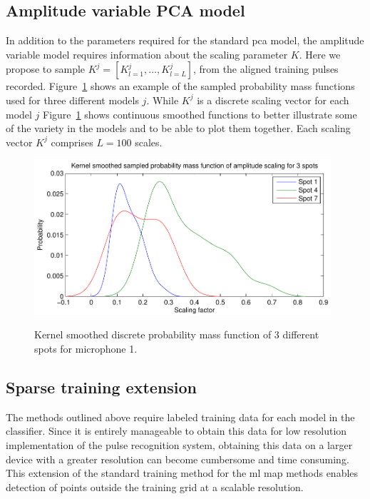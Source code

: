 \subsection{Amplitude variable PCA model}

In addition to the parameters required for the standard \DIFdelbegin {}\DIFdelend \DIFaddbegin \gls{pca} \DIFaddend model, the amplitude variable model requires information about the scaling parameter $K$. Here we propose to sample $K^j = [K^j_{l=1}, \ldots , K^j_{l=L}]$, from the aligned training pulses recorded. Figure~\ref{fig:amplitudeProbMass.pdf} shows an example of the sampled probability mass functions used for three different models $j$. \DIFaddbegin {}\DIFaddend While $K^j$ is a discrete scaling vector for each model $j$ Figure~\ref{fig:amplitudeProbMass.pdf} shows continuous smoothed functions to better illustrate some of the variety in the models and to be able to plot them together. Each scaling vector $K^j$ comprises $L=100$ scales.

\begin{figure}
\centering
  \includegraphics[width=110mm]{amplitudeProbMass.pdf}\\
  \caption{Kernel smoothed discrete probability mass function of 3 different spots for microphone 1.}\label{fig:amplitudeProbMass.pdf}
\end{figure}

\subsection{Sparse training extension}\label{sec:APRspareTraining}
The methods outlined above require labeled training data for each model in the classifier. Since it is entirely manageable to obtain this data for low resolution implementation of the pulse recognition system, obtaining this data on a larger device with a greater resolution can become cumbersome and time consuming. This extension of the standard training method for the \DIFdelbegin {}\DIFdelend \DIFaddbegin \gls{ml} \gls{map} \DIFaddend methods enables detection of points outside the training grid at a scalable resolution.


